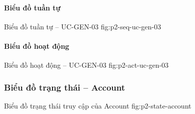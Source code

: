 \clearpage
\paragraph{Biểu đồ tuần tự}
  {Biểu đồ tuần tự -- UC-GEN-03}
  {fig:p2-seq-uc-gen-03}

\clearpage
\paragraph{Biểu đồ hoạt động}
  {Biểu đồ hoạt động -- UC-GEN-03}
  {fig:p2-act-uc-gen-03}

\clearpage
\subsubsection{Biểu đồ trạng thái -- Account}
  {Biểu đồ trạng thái truy cập của Account}
  {fig:p2-state-account}
\clearpage
